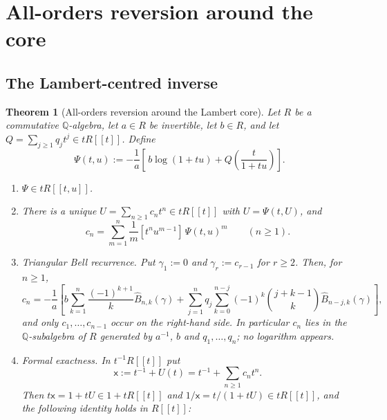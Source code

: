 \documentclass[11pt,a4paper,oneside]{book}
\theoremstyle{plain}
\newtheorem{theorem}{Theorem}[chapter]
\theoremstyle{definition}
\theoremstyle{remark}
\newcommand{\Rat}{\mathbb{Q}}
\newcommand{\Coef}[1]{[#1]\,}
\newcommand{\OB}{\widehat{B}}
\begin{document}
\section{All-orders reversion around the core}\label{p0:sec:reversion}

\subsection{The Lambert-centred inverse}

\begin{theorem}[All-orders reversion around the Lambert core]
\label{p0:thm:lambert-centered}
Let $R$ be a commutative $\Rat$-algebra, let $a\in R$ be invertible, let
$b\in R$, and let $Q=\sum_{j\ge1}q_jt^j\in tR[[t]]$.  Define
\begin{equation}\label{p0:eq:Psi-general}
 \Psi(t,u):=-\frac1a\left[\,b\log(1+tu)
   +Q\!\left(\frac{t}{1+tu}\right)\right].
\end{equation}
\begin{enumerate}
\item $\Psi\in tR[[t,u]]$.
\item There is a unique $U=\sum_{n\ge1}c_nt^n\in tR[[t]]$ with
      $U=\Psi(t,U)$, and
      \begin{equation}\label{p0:eq:c-lagrange}
       c_n=\sum_{m=1}^{n}\frac1m\Coef{t^nu^{m-1}}\Psi(t,u)^m
       \qquad(n\ge1).
      \end{equation}
\item \emph{Triangular Bell recurrence.}  Put $\gamma_1:=0$ and
      $\gamma_r:=c_{r-1}$ for $r\ge2$.  Then, for $n\ge1$,
      \begin{equation}\label{p0:eq:c-bell}
       c_n=-\frac1a\left[
         b\sum_{k=1}^{n}\frac{(-1)^{k+1}}{k}\OB_{n,k}(\gamma)
         +\sum_{j=1}^{n}q_j\sum_{k=0}^{n-j}(-1)^{k}
            \binom{j+k-1}{k}\OB_{n-j,k}(\gamma)
       \right],
      \end{equation}
      and only $c_1,\dots,c_{n-1}$ occur on the right-hand side.  In
      particular $c_n$ lies in the $\Rat$-subalgebra of $R$ generated by
      $a^{-1}$, $b$ and $q_1,\dots,q_n$; no logarithm appears.
\item \emph{Formal exactness.}  In $t^{-1}R[[t]]$ put
      \begin{equation}\label{p0:eq:centered-ansatz}
       \mathsf x:=t^{-1}+U(t)=t^{-1}+\sum_{n\ge1}c_nt^n .
      \end{equation}
      Then $t\mathsf x=1+tU\in1+tR[[t]]$ and $1/\mathsf x=t/(1+tU)\in tR[[t]]$,
      and the following identity holds in $R[[t]]$:

\end{enumerate}
\end{theorem}
\end{document}
